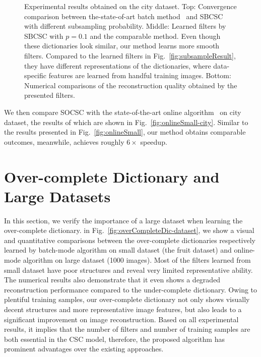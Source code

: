 \begin{figure}[h]

\caption{Experimental results obtained on the city dataset. Top: Convergence comparison between the-state-of-art batch method~\cite{heide2015fast} and SBCSC with different subsampling probability. Middle: Learned filters by SBCSC with $p=0.1$ and the comparable method. Even though these dictionaries look similar, our method learns more smooth filters. Compared to the learned filters in Fig.\ \ref{fig:subsampleResult}, they have different representations of the dictionaries, where data-specific features are learned from handful training images. Bottom: Numerical comparisons of the reconstruction quality obtained by the presented filters.}
\label{fig:subsampleResult-city}
\end{figure}

We then compare SOCSC with the state-of-the-art online algorithm~\cite{liu-2018-first} on city dataset, the results of which are shown in Fig.\ \ref{fig:onlineSmall-city}. Similar to the results presented in Fig.\ \ref{fig:onlineSmall}, our method obtains comparable outcomes, meanwhile, achieves roughly $6 \times$ speedup.

\section{Over-complete Dictionary and Large Datasets}
In this section, we verify the importance of a large dataset when learning the over-complete dictionary. in Fig.~\ref{fig:overCompleteDic-dataset}, we show a visual and quantitative comparisons between the over-complete dictionaries respectively learned by batch-mode algorithm on small dataset (the fruit dataset) and online-mode algorithm on large dataset (1000 images). Most of the filters learned from small dataset have poor structures and reveal very limited representative ability. The numerical results also demonstrate that it even shows a degraded reconstruction performance compared to the under-complete dictionary. Owing to plentiful training samples, our over-complete dictionary not only shows visually decent structures and more representative image features, but also leads to a significant improvement on image reconstruction. Based on all experimental results, it implies that the number of filters and number of training samples are both essential in the CSC model, therefore, the proposed algorithm has prominent advantages over the existing approaches.

